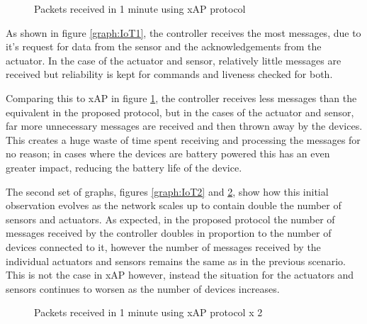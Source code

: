 \begin{figure}[h]
\begin{center}
\begin{minipage}{.5\textwidth}

\caption{Packets received in 1 minute using IoT protocol}
\label{graph:IoT1}
\end{minipage}%
\begin{minipage}{.5\textwidth}

\caption{Packets received in 1 minute using xAP protocol}
\label{graph:xAP1}
\end{minipage}
\end{center}
\end{figure}

As shown in figure \ref{graph:IoT1}, the controller receives the most messages, due to it's request for data from the sensor and the acknowledgements from the actuator. In the case of the actuator and sensor, relatively little messages are received but reliability is kept for commands and liveness checked for both. 

Comparing this to xAP in figure \ref{graph:xAP1}, the controller receives less messages than the equivalent in the proposed protocol, but in the cases of the actuator and sensor, far more unnecessary messages are received and then thrown away by the devices. This creates a huge waste of time spent receiving and processing the messages for no reason; in cases where the devices are battery powered this has an even greater impact, reducing the battery life of the device.

The second set of graphs, figures \ref{graph:IoT2} and \ref{graph:xAP2}, show how this initial observation evolves as the network scales up to contain double the number of sensors and actuators. As expected, in the proposed protocol the number of messages received by the controller doubles in proportion to the number of devices connected to it, however the number of messages received by the individual actuators and sensors remains the same as in the previous scenario. This is not the case in xAP however, instead the situation for the actuators and sensors continues to worsen as the number of devices increases.
\begin{figure}[h]
\begin{center}
\begin{minipage}{.5\textwidth}

\caption{Packets received in 1 minute using IoT protocol x 2}
\label{graph:IoT2}
\end{minipage}%
\begin{minipage}{.5\textwidth}

\caption{Packets received in 1 minute using xAP protocol x 2}
\label{graph:xAP2}
\end{minipage}
\end{center}
\end{figure}

